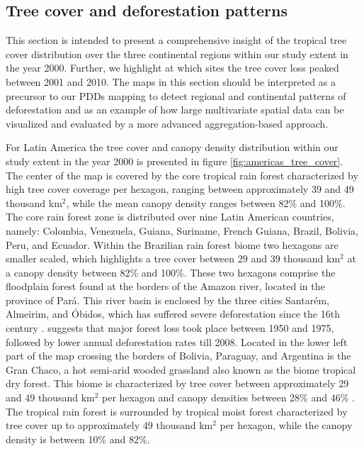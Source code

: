 		\subsection{Tree cover and deforestation patterns}
		\label{subsec:results_tree_cover_and_deforestation}
			This section is intended to present a comprehensive insight of the tropical tree cover distribution over the three continental regions within our study extent in the year 2000. Further, we highlight at which sites the tree cover loss peaked between 2001 and 2010. The maps in this section should be interpreted as a precursor to our \acp{PDD} mapping to detect regional and continental patterns of deforestation and as an example of how large multivariate spatial data can be visualized and evaluated by a more advanced aggregation-based approach.

			For Latin America the tree cover and canopy density distribution within our study extent in the year 2000 is presented in figure \ref{fig:americas_tree_cover}. The center of the map is covered by the core tropical rain forest characterized by high tree cover coverage per hexagon, ranging between approximately 39 and 49 thousand km$^2$, while the mean canopy density ranges between 82\% and 100\%. The core rain forest zone is distributed over nine Latin American countries, namely: Colombia, Venezuela, Guiana, Suriname, French Guiana, Brazil, Bolivia, Peru, and Ecuador. Within the Brazilian rain forest biome two hexagons are smaller scaled, which highlights a tree cover between 29 and 39 thousand km$^2$ at a canopy density between 82\% and 100\%. These two hexagons comprise the floodplain forest found at the borders of the Amazon river, located in the province of Pará. This river basin is enclosed by the three cities Santarém, Almeirim, and Óbidos, which has suffered severe deforestation since the 16th century \citep{Reno2011}. \citeauthor{Reno2011} suggests that major forest loss took place between 1950 and 1975, followed by lower annual deforestation rates till 2008. Located in the lower left part of the map crossing the borders of Bolivia, Paraguay, and Argentina is the Gran Chaco, a hot semi-arid wooded grassland also known as the biome tropical dry forest. This biome is characterized by tree cover between approximately 29 and 49 thousand km$^2$ per hexagon and canopy densities between 28\% and 46\% \citep{Caldas2013}. The tropical rain forest is surrounded by tropical moist forest characterized by tree cover up to approximately 49 thousand km$^2$ per hexagon, while the canopy density is between 10\% and 82\%.
